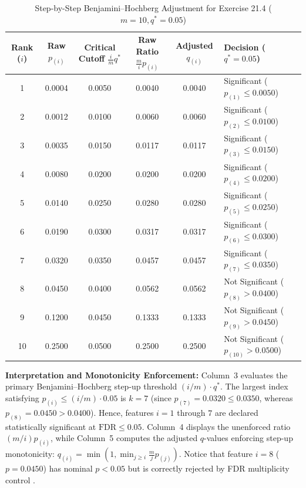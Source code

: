 \documentclass[11pt,twoside,openright]{book}
\begin{document}
\begin{table}[ht]
\centering
\caption{Step-by-Step Benjamini--Hochberg Adjustment for Exercise 21.4 ($m = 10, q^* = 0.05$)}
\label{tab:bh_exercise}
\small
\begin{tabularx}{\textwidth}{cccccX}
\toprule
\textbf{Rank ($i$)} & \textbf{Raw $p_{(i)}$} & \textbf{Critical Cutoff $\frac{i}{m} q^*$} & \textbf{Raw Ratio $\frac{m}{i} p_{(i)}$} & \textbf{Adjusted $q_{(i)}$} & \textbf{Decision ($q^* = 0.05$)} \\
\midrule
1  & 0.0004 & 0.0050 & 0.0040 & 0.0040 & Significant ($p_{(1)} \le 0.0050$) \\
2  & 0.0012 & 0.0100 & 0.0060 & 0.0060 & Significant ($p_{(2)} \le 0.0100$) \\
3  & 0.0035 & 0.0150 & 0.0117 & 0.0117 & Significant ($p_{(3)} \le 0.0150$) \\
4  & 0.0080 & 0.0200 & 0.0200 & 0.0200 & Significant ($p_{(4)} \le 0.0200$) \\
5  & 0.0140 & 0.0250 & 0.0280 & 0.0280 & Significant ($p_{(5)} \le 0.0250$) \\
6  & 0.0190 & 0.0300 & 0.0317 & 0.0317 & Significant ($p_{(6)} \le 0.0300$) \\
7  & 0.0320 & 0.0350 & 0.0457 & 0.0457 & Significant ($p_{(7)} \le 0.0350$) \\
8  & 0.0450 & 0.0400 & 0.0562 & 0.0562 & Not Significant ($p_{(8)} > 0.0400$) \\
9  & 0.1200 & 0.0450 & 0.1333 & 0.1333 & Not Significant ($p_{(9)} > 0.0450$) \\
10 & 0.2500 & 0.0500 & 0.2500 & 0.2500 & Not Significant ($p_{(10)} > 0.0500$) \\
\bottomrule
\end{tabularx}
\end{table}

\noindent
\textbf{Interpretation and Monotonicity Enforcement:} Column~3 evaluates the primary Benjamini--Hochberg step-up threshold $(i/m) \cdot q^*$. The largest index satisfying $p_{(i)} \le (i/m) \cdot 0.05$ is $k = 7$ (since $p_{(7)} = 0.0320 \le 0.0350$, whereas $p_{(8)} = 0.0450 > 0.0400$). Hence, features $i = 1$ through $7$ are declared statistically significant at $\text{FDR} \le 0.05$. Column~4 displays the unenforced ratio $(m/i) p_{(i)}$, while Column~5 computes the adjusted $q$-values enforcing step-up monotonicity: $q_{(i)} = \min\left(1, \min_{j \ge i} \frac{m}{j} p_{(j)}\right)$. Notice that feature $i=8$ ($p = 0.0450$) has nominal $p < 0.05$ but is correctly rejected by FDR multiplicity control \cite{benjamini1995controlling}.
\end{document}
